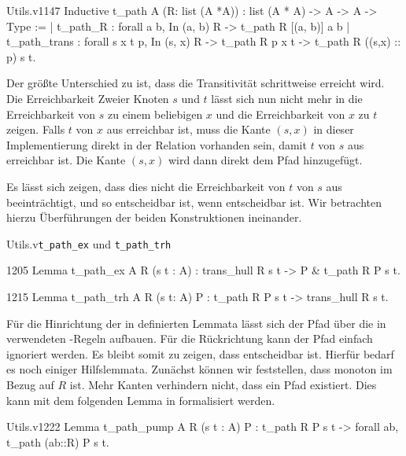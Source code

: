 \begin{code}[t_path]{Utils.v}{}{1147}
Inductive t_path {A} (R: list (A *A)) : 
    list (A * A) -> A -> A -> Type :=
  | t_path_R : forall a b, In (a, b) R -> t_path R [(a, b)] a b
  | t_path_trans : forall s x t p, In (s, x) R -> t_path R p x t -> 
      t_path R ((s,x) :: p) s t.
\end{code}

Der größte Unterschied zu  ist, dass die Transitivität schrittweise erreicht wird. Die Erreichbarkeit Zweier Knoten $s$ und $t$ lässt sich nun nicht mehr in die Erreichbarkeit von $s$ zu einem beliebigen $x$ und die Erreichbarkeit von $x$ zu $t$ zeigen. Falls $t$ von $x$ aus erreichbar ist, muss die Kante $(s,x)$ in dieser Implementierung direkt in der Relation vorhanden sein, damit $t$ von $s$ aus erreichbar ist. Die Kante $(s,x)$ wird dann direkt dem Pfad hinzugefügt. 

Es lässt sich zeigen, dass dies nicht die Erreichbarkeit von $t$ von $s$ aus beeinträchtigt, und so  entscheidbar ist, wenn  entscheidbar ist. Wir betrachten hierzu Überführungen der beiden Konstruktionen ineinander.
\begin{multicode}[t_path_ex]{Utils.v}{}{\texttt{t\_path\_ex} und \texttt{t\_path\_trh}}
    \begin{mcode}{1205}
Lemma t_path_ex {A} R (s t : A) : trans_hull R s t ->
    {P & t_path R P s t}.
\end{mcode}
\begin{mcode}{1215}
Lemma t_path_trh {A} R (s t: A) P : 
    t_path R P s t -> trans_hull R s t.
\end{mcode}
\end{multicode}
Für die Hinrichtung der in  definierten Lemmata lässt sich der Pfad  über die in  verwendeten -Regeln aufbauen. Für die Rückrichtung kann der Pfad einfach ignoriert werden. Es bleibt somit zu zeigen, dass  entscheidbar ist. Hierfür bedarf es noch einiger Hilfslemmata. Zunächst können wir feststellen, dass  monoton im Bezug auf $R$ ist. Mehr Kanten verhindern nicht, dass ein Pfad existiert. Dies kann mit dem folgenden Lemma in  formalisiert werden.
\begin{code}{Utils.v}{}{1222}
Lemma t_path_pump {A} R (s t : A) P : t_path R P s t -> 
    forall ab, t_path (ab::R) P s t.
\end{code}

